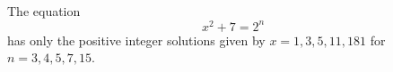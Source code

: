 \begin{proposition}
    The equation
\[
    x^2+7=2^n
\]
    has only the positive integer solutions given by $x=1,3,5,11,181$ for $n=3,4,5,7,15$.
\end{proposition}
